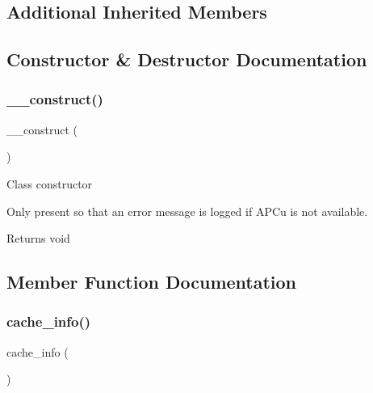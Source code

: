 \subsection*{Additional Inherited Members}


\subsection{Constructor \& Destructor Documentation}
\mbox{\label{class_c_i___cache__apcu_a095c5d389db211932136b53f25f39685}} 
\subsubsection{\texorpdfstring{\+\_\+\+\_\+construct()}{\_\_construct()}}
{\footnotesize\ttfamily \+\_\+\+\_\+construct (\begin{DoxyParamCaption}{ }\end{DoxyParamCaption})}

Class constructor

Only present so that an error message is logged if A\+P\+Cu is not available.

\begin{DoxyReturn}{Returns}
void 
\end{DoxyReturn}


\subsection{Member Function Documentation}
\mbox{\label{class_c_i___cache__apcu_acb4742926a6fa901e4f0917e1a35ef4c}} 
\subsubsection{\texorpdfstring{cache\+\_\+info()}{cache\_info()}}
{\footnotesize\ttfamily cache\+\_\+info (\begin{DoxyParamCaption}{ }\end{DoxyParamCaption})}

